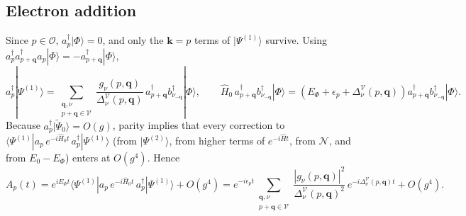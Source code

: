 \subsection{Electron addition}
Since $p\in\mathcal O$, $a_p^\dagger|\Phi\rangle=0$, and only the $\bm k=p$ terms of $|\Psi^{(1)}\rangle$ survive. Using $a_p^\dagger a^\dagger_{p+\bm q}a_p|\Phi\rangle=-a^\dagger_{p+\bm q}|\Phi\rangle$,
\begin{equation}
a_p^\dagger|\Psi^{(1)}\rangle=\sum_{\substack{\bm q,\nu\\ p+\bm q\in\mathcal V}}\frac{g_\nu(p,\bm q)}{\Delta^{\mathcal V}_\nu(p,\bm q)}\,a^\dagger_{p+\bm q}b^\dagger_{\nu_{-\bm q}}|\Phi\rangle,
\qquad
\hat H_0\,a^\dagger_{p+\bm q}b^\dagger_{\nu_{-\bm q}}|\Phi\rangle=\left(E_\Phi+\epsilon_p+\Delta^{\mathcal V}_\nu(p,\bm q)\right)a^\dagger_{p+\bm q}b^\dagger_{\nu_{-\bm q}}|\Phi\rangle .
\end{equation}
Because $a_p^\dagger|\tilde\Psi_0\rangle=O(g)$, parity implies that every correction to $\langle\Psi^{(1)}|a_p\,e^{-i\hat H_0t}\,a_p^\dagger|\Psi^{(1)}\rangle$ (from $|\Psi^{(2)}\rangle$, from higher terms of $e^{-i\hat Ht}$, from $\mathcal N$, and from $E_0-E_\Phi$) enters at $O(g^4)$. Hence
\begin{equation}
A_p(t)=e^{iE_\Phi t}\langle\Psi^{(1)}|a_p\,e^{-i\hat H_0t}\,a_p^\dagger|\Psi^{(1)}\rangle+O(g^4)
=e^{-i\epsilon_pt}\sum_{\substack{\bm q,\nu\\ p+\bm q\in\mathcal V}}\frac{|g_\nu(p,\bm q)|^2}{\Delta^{\mathcal V}_\nu(p,\bm q)^2}\,e^{-i\Delta^{\mathcal V}_\nu(p,\bm q)t}+O(g^4).
\label{eq:addition_final}
\end{equation}

